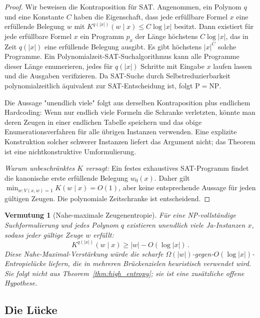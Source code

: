 \documentclass[aps,prd,twocolumn,superscriptaddress,nofootinbib]{revtex4-2}
\newtheorem{conjecture}[theorem]{Vermutung}
\theoremstyle{definition}
\theoremstyle{remark}
\newcommand{\NP}{\mathrm{NP}}
\newcommand{\PP}{\mathrm{P}}
\begin{document}
\begin{proof}
Wir beweisen die Kontraposition für SAT. Angenommen, ein Polynom $q$ und eine Konstante $C$ haben die Eigenschaft, dass jede erfüllbare Formel $x$ eine erfüllende Belegung $w$ mit $K^{q(|x|)}(w \mid x) \leq C\log |x|$ besitzt. Dann existiert für jede erfüllbare Formel $x$ ein Programm $p_x$ der Länge höchstens $C\log |x|$, das in Zeit $q(|x|)$ eine erfüllende Belegung ausgibt. Es gibt höchstens $|x|^C$ solche Programme. Ein Polynomialzeit-SAT-Suchalgorithmus kann alle Programme dieser Länge enumerieren, jedes für $q(|x|)$ Schritte mit Eingabe $x$ laufen lassen und die Ausgaben verifizieren. Da SAT-Suche durch Selbstreduzierbarkeit polynomialzeitlich äquivalent zur SAT-Entscheidung ist, folgt $\PP=\NP$.

Die Aussage "unendlich viele" folgt aus derselben Kontraposition plus endlichem Hardcoding: Wenn nur endlich viele Formeln die Schranke verletzten, könnte man deren Zeugen in einer endlichen Tabelle speichern und das obige Enumerationsverfahren für alle übrigen Instanzen verwenden. Eine explizite Konstruktion solcher schwerer Instanzen liefert das Argument nicht; das Theorem ist eine nichtkonstruktive Umformulierung.

\textit{Warum unbeschränktes $K$ versagt:} Ein festes exhaustives
SAT-Programm findet die kanonische erste erfüllende Belegung $w_0(x)$.
Daher gilt $\min_{w:V(x,w)=1}K(w\mid x)=O(1)$, aber keine entsprechende
Aussage für jeden gültigen Zeugen. Die polynomiale Zeitschranke ist
entscheidend.
\end{proof}

\begin{conjecture}[Nahe-maximale Zeugenentropie]
\label{conj:near-maximal-witness-entropy}
Für eine NP-vollständige Suchformulierung und jedes Polynom $q$ existieren unendlich viele Ja-Instanzen $x$, sodass jeder gültige Zeuge $w$ erfüllt:
\begin{equation}
K^{q(|x|)}(w \mid x) \geq |w| - O(\log |x|)\,.
\end{equation}
Diese Nahe-Maximal-Verstärkung würde die scharfe $\Omega(|w|)$-gegen-$O(\log |x|)$-Entropielücke liefern, die in mehreren Brückenzielen heuristisch verwendet wird. Sie folgt nicht aus Theorem~\ref{thm:high_entropy}; sie ist eine zusätzliche offene Hypothese.
\end{conjecture}


\subsection{Die Lücke}
\end{document}
